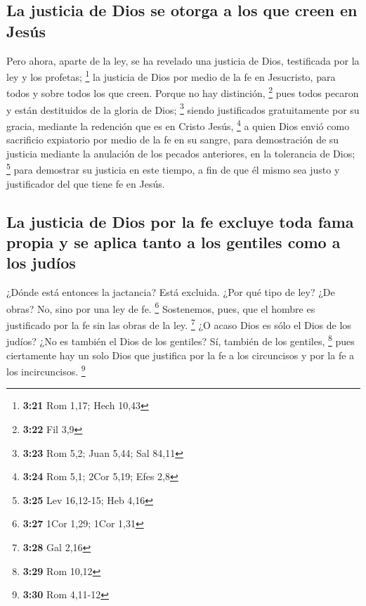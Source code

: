 \hypertarget{la-justicia-de-dios-se-otorga-a-los-que-creen-en-jesuxfas}{%
\subsection{La justicia de Dios se otorga a los que creen en
Jesús}\label{la-justicia-de-dios-se-otorga-a-los-que-creen-en-jesuxfas}}

 Pero ahora, aparte de la ley, se ha revelado una
justicia de Dios, testificada por la ley y los profetas; \footnote{\textbf{3:21}
  Rom 1,17; Hech 10,43}  la justicia de Dios por medio de
la fe en Jesucristo, para todos y sobre todos los que creen. Porque no
hay distinción, \footnote{\textbf{3:22} Fil 3,9}  pues
todos pecaron y están destituidos de la gloria de Dios; \footnote{\textbf{3:23}
  Rom 5,2; Juan 5,44; Sal 84,11}  siendo justificados
gratuitamente por su gracia, mediante la redención que es en Cristo
Jesús, \footnote{\textbf{3:24} Rom 5,1; 2Cor 5,19; Efes 2,8}
 a quien Dios envió como sacrificio expiatorio por medio
de la fe en su sangre, para demostración de su justicia mediante la
anulación de los pecados anteriores, en la tolerancia de Dios;
\footnote{\textbf{3:25} Lev 16,12-15; Heb 4,16}  para
demostrar su justicia en este tiempo, a fin de que él mismo sea justo y
justificador del que tiene fe en Jesús.

\hypertarget{la-justicia-de-dios-por-la-fe-excluye-toda-fama-propia-y-se-aplica-tanto-a-los-gentiles-como-a-los-juduxedos}{%
\subsection{La justicia de Dios por la fe excluye toda fama propia y se
aplica tanto a los gentiles como a los
judíos}\label{la-justicia-de-dios-por-la-fe-excluye-toda-fama-propia-y-se-aplica-tanto-a-los-gentiles-como-a-los-juduxedos}}

 ¿Dónde está entonces la jactancia? Está excluida. ¿Por
qué tipo de ley? ¿De obras? No, sino por una ley de fe. \footnote{\textbf{3:27}
  1Cor 1,29; 1Cor 1,31}  Sostenemos, pues, que el hombre
es justificado por la fe sin las obras de la ley. \footnote{\textbf{3:28}
  Gal 2,16}  ¿O acaso Dios es sólo el Dios de los judíos?
¿No es también el Dios de los gentiles? Sí, también de los gentiles,
\footnote{\textbf{3:29} Rom 10,12}  pues ciertamente hay
un solo Dios que justifica por la fe a los circuncisos y por la fe a los
incircuncisos. \footnote{\textbf{3:30} Rom 4,11-12}


